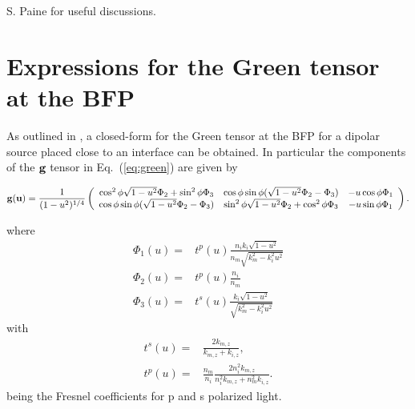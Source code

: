 \documentclass[reprint,aps,pra,superscriptaddress,
amsmath,amssymb]{revtex4-1}
\begin{document}
\begin{acknowledgments}
S. Paine for useful discussions.
\end{acknowledgments}

 \appendix

\section{Expressions for the Green tensor at the BFP}

As outlined in \cite{novotny2006principles}, a closed-form for the Green tensor at the BFP for a dipolar source placed close to an interface can be obtained. In particular the components of the $\textbf g$  tensor in Eq.~(\ref{eq:green}) are given by
\begin{widetext}
\begin{align}
\textbf g(\textbf u) =\frac{1}{(1-u^2)^{1/4}} \left( 
\begin{array}{ccc}
\cos^2 \phi \sqrt{1-u^2} \Phi_2 + \sin^2 \phi \Phi_3 & \cos \phi \sin \phi ( \sqrt{1-u^2} \Phi_2 - \Phi_3) & -u \cos \phi \Phi_1  \\
\cos \phi \sin \phi ( \sqrt{1-u^2} \Phi_2 - \Phi_3) &  \sin^2 \phi \sqrt{1-u^2} \Phi_2 + \cos^2 \phi \Phi_3 & - u \sin  \phi \Phi_1
\end{array}
\right).
\end{align}
\end{widetext}
where 
\bse
\begin{align}
\Phi_1(u) = & t^p(u) \frac{n_i k_i\sqrt{1-u^2} }{n_m \sqrt{k_m^2 -k_i^2 u^2}} \\
\Phi_2(u) = & t^p(u)\frac{n_i}{n_m} \\
\Phi_3(u) = & t^s(u) \frac{k_i \sqrt{1-u^2}}{\sqrt{k_m^2 -k_i^2 u^2}}
\end{align}
\ese
with
\bse
\begin{align}
t^s(u) = & \frac{2k_{m,z}}{k_{m,z} + k_{i,z}},\\
t^p(u) = &  \frac{n_m}{n_i}\frac{2n_i^2 k_{m,z}}{n_i^2 k_{m,z} + n_m^2 k_{i,z}}.
\end{align}
\ese
being the Fresnel coefficients for p and s polarized light.


%

\end{document}
